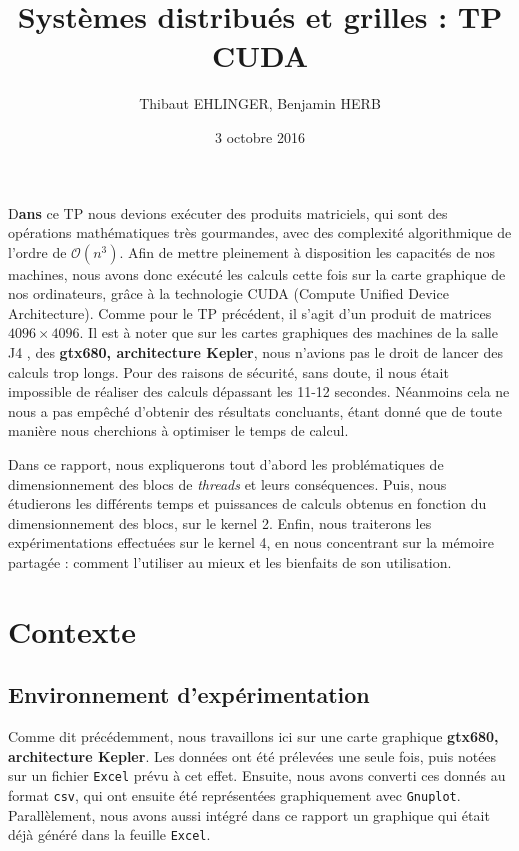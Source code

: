 \documentclass[	DIV=calc,%
							paper=a4,%
							fontsize=11pt%
							]{scrartcl}	 					%
\title{Systèmes distribués et grilles : TP CUDA}					%
\author{Thibaut EHLINGER, Benjamin HERB }											%
\date{3 octobre 2016}
\newcommand{\initial}[1]{%
     \lettrine[lines=3,lhang=0.3,nindent=0em]{
     				\color{DarkGoldenrod}
     				{\textsf{#1}}}{}}
\begin{document}
\maketitle
\thispagestyle{fancy} 			%
\initial{D}\textbf{ans} ce TP nous devions exécuter des produits matriciels, qui sont des opérations mathématiques très gourmandes, avec des complexité algorithmique de l'ordre de $ \mathcal{O}(n^3)$. Afin de mettre pleinement à disposition les capacités de nos machines, nous avons donc exécuté les calculs cette fois sur la carte graphique de nos ordinateurs, grâce à la technologie CUDA (Compute Unified Device Architecture). Comme pour le TP précédent, il s'agit d'un produit de matrices $ 4096 \times 4096$. Il est à noter que sur les cartes graphiques des machines de la salle J4 , des \textbf{gtx680, architecture Kepler}, nous n'avions pas le droit de lancer des calculs trop longs. Pour des raisons de sécurité, sans doute, il nous était impossible de réaliser des calculs dépassant les 11-12 secondes. Néanmoins cela ne nous a pas empêché d'obtenir des résultats concluants, étant donné que de toute manière nous cherchions à optimiser le temps de calcul.\par
Dans ce rapport, nous expliquerons tout d'abord les problématiques de dimensionnement des blocs de \textit{threads} et leurs conséquences. Puis, nous étudierons les différents temps et puissances de calculs obtenus en fonction du dimensionnement des blocs, sur le kernel 2. Enfin, nous traiterons les expérimentations effectuées sur le kernel 4, en nous concentrant sur la mémoire partagée : comment l'utiliser au mieux et les bienfaits de son utilisation. 

\section{Contexte}
\subsection{Environnement d'expérimentation}
Comme dit précédemment, nous travaillons ici sur une carte graphique \textbf{gtx680, architecture Kepler}. Les données ont été prélevées une seule fois, puis notées sur un fichier \texttt{Excel} prévu à cet effet. Ensuite, nous avons converti ces donnés au format \texttt{csv}, qui ont ensuite été représentées graphiquement avec \texttt{Gnuplot}. Parallèlement, nous avons aussi intégré dans ce rapport un graphique qui était déjà généré dans la feuille \texttt{Excel}.
\end{document}
